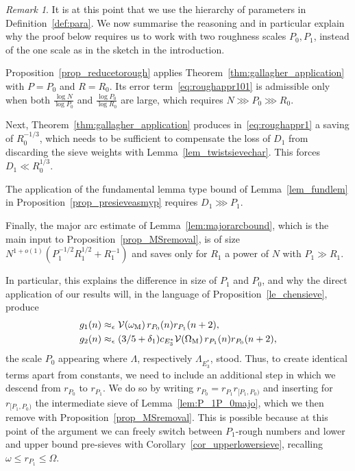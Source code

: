 \documentclass[12pt]{amsart}
\theoremstyle{definition}
\theoremstyle{remark}
\newtheorem{remark}[theorem]{Remark}
\numberwithin{equation}{section}
\newcommand{\1}{\mathbf{1}}
\begin{document}
\begin{remark}\label{rem:roughnessplit}
    It is at this point that we use the hierarchy of parameters in Definition~\ref{def:para}. We now summarise the reasoning and in particular explain why the proof below requires us to work with two roughness scales $P_0, P_1$, instead of the one scale as in the sketch in the introduction.

      Proposition~\ref{prop_reducetorough} applies Theorem~\ref{thm:gallagher_application} with $P=P_0$ and $R=R_0$. Its error term~\eqref{eq:roughappr101} is admissible only when both $\frac{\log N}{\log P_0}$ and $\frac{\log P_0}{\log R_0}$ are large, which requires $N\ggg P_0\ggg R_0$.

       Next, Theorem~\ref{thm:gallagher_application} produces in~\eqref{eq:roughappr1} a saving of $R_0^{-1/3}$, which needs to be sufficient to compensate the loss of $D_1$ from discarding the sieve weights with Lemma~\ref{lem_twistsievechar}. This forces $D_1\ll R_0^{1/3}$.

       The application of the fundamental lemma type bound of Lemma~\ref{lem_fundlem} in Proposition~\ref{prop_presieveasmyp} requires $D_1\ggg P_1$.

       Finally, the major arc estimate of Lemma~\ref{lem:majorarcbound}, which is the main input to Proposition~\ref{prop_MSremoval}, is of size $N^{1+o(1)}(P_1^{-1/2}R_1^{1/2}+R_1^{-1})$ and saves only for $R_1$ a power of $N$ with $P_1\gg R_1$.

       In particular, this explains the difference in size of $P_1$ and $P_0$, and why the direct application of our results will, in the language of Proposition~\ref{le_chensieve}, produce
       \begin{align*}
          g_1(n)&\approx_\epsilon \mathcal{V}(\omega_{\textup{M}})\, r_{P_0}(n)r_{P_1}(n+2),\\
          g_2(n)&\approx_\epsilon (3/5+\delta_1)c_{E_3^*}\mathcal{V}(\Omega_{\textup{M}})\, r_{P_1}(n)r_{P_0}(n+2),
       \end{align*}
       the scale $P_0$ appearing where $\Lambda$, respectively $\Lambda_{E_3^*}$, stood. Thus, to create identical terms apart from constants, we need to include an additional step in which we descend from $r_{P_0}$ to $r_{P_1}$. We do so by writing $r_{P_0}=r_{P_1}r_{[P_1,P_0)}$ and inserting for $r_{[P_1,P_0)}$ the intermediate sieve of Lemma~\ref{lem:P_1P_0majo}, which we then remove with Proposition~\ref{prop_MSremoval}. This is possible because at this point of the argument we can freely switch between $P_1$-rough numbers and lower and upper bound pre-sieves with Corollary~\ref{cor_upperlowersieve}, recalling $\omega\leq r_{P_1}\leq \Omega$.
\end{remark}
\end{document}
